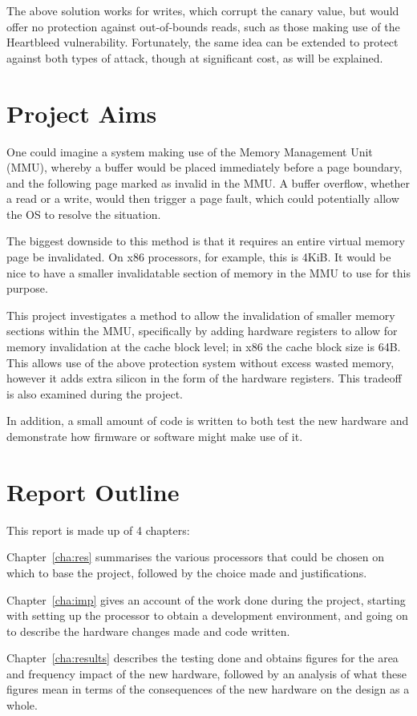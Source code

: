 The above solution works for writes, which corrupt the canary value, but would offer no protection against out-of-bounds reads, such as those making use of the Heartbleed vulnerability. Fortunately, the same idea can be extended to protect against both types of attack, though at significant cost, as will be explained.

\section{Project Aims}
One could imagine a system making use of the Memory Management Unit (MMU), whereby a buffer would be placed immediately before a page boundary, and the following page marked as invalid in the MMU. A buffer overflow, whether a read or a write, would then trigger a page fault, which could potentially allow the OS to resolve the situation.

The biggest downside to this method is that it requires an entire virtual memory page be invalidated. On x86 processors, for example, this is 4KiB. It would be nice to have a smaller invalidatable section of memory in the MMU to use for this purpose.

This project investigates a method to allow the invalidation of smaller memory sections within the MMU, specifically by adding hardware registers to allow for memory invalidation at the cache block level; in x86 the cache block size is 64B. This allows use of the above protection system without excess wasted memory, however it adds extra silicon in the form of the hardware registers. This tradeoff is also examined during the project.

In addition, a small amount of code is written to both test the new hardware and demonstrate how firmware or software might make use of it.

\section{Report Outline}
This report is made up of 4 chapters:

Chapter~\ref{cha:res} summarises the various processors that could be chosen on which to base the project, followed by the choice made and justifications.

Chapter~\ref{cha:imp} gives an account of the work done during the project, starting with setting up the processor to obtain a development environment, and going on to describe the hardware changes made and code written.

Chapter~\ref{cha:results} describes the testing done and obtains figures for the area and frequency impact of the new hardware, followed by an analysis of what these figures mean in terms of the consequences of the new hardware on the design as a whole.